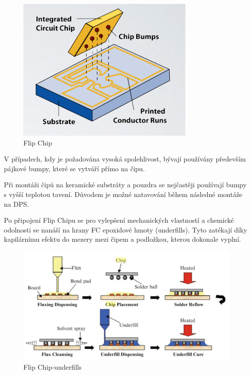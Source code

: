 \begin{figure}[h]
   \begin{center}
     \includegraphics[scale=0.6]{images/FC.png}
   \end{center}
   \caption{Flip Chip}
\end{figure}

V případech, kdy je požadována vysoká spolehlivost, bývají používány především pájkové
bumpy, které se vytváří přímo na čipu.

Při montáži čipů na keramické substráty a pouzdra se nejčastěji používají bumpy s vyšší teplotou tavení. Důvodem je možné natavování během následné montáže na DPS.

Po připojení Flip Chipu se pro vylepšení mechanických vlastností a chemické odolnosti se nanáší na hrany FC epoxidové hmoty (underfills). Tyto zatékají díky kapilárnímu efektu do mezery mezi čipem a podložkou, kterou dokonale vyplní.

\begin{figure}[h]
   \begin{center}
     \includegraphics[scale=0.6]{images/FC2.png}
   \end{center}
   \caption{Flip Chip-underfills}
\end{figure}

